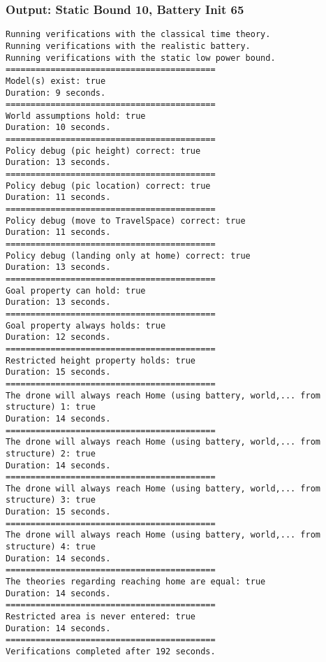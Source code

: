 \documentclass[12pt]{extarticle}
\begin{document}
\subsubsection*{Output: Static Bound 10, Battery Init 65}
\begin{lstlisting}[basicstyle=\tiny]
Running verifications with the classical time theory.
Running verifications with the realistic battery.
Running verifications with the static low power bound.
==========================================
Model(s) exist: true
Duration: 9 seconds.
==========================================
World assumptions hold: true
Duration: 10 seconds.
==========================================
Policy debug (pic height) correct: true
Duration: 13 seconds.
==========================================
Policy debug (pic location) correct: true
Duration: 11 seconds.
==========================================
Policy debug (move to TravelSpace) correct: true
Duration: 11 seconds.
==========================================
Policy debug (landing only at home) correct: true
Duration: 13 seconds.
==========================================
Goal property can hold: true
Duration: 13 seconds.
==========================================
Goal property always holds: true
Duration: 12 seconds.
==========================================
Restricted height property holds: true
Duration: 15 seconds.
==========================================
The drone will always reach Home (using battery, world,... from structure) 1: true
Duration: 14 seconds.
==========================================
The drone will always reach Home (using battery, world,... from structure) 2: true
Duration: 14 seconds.
==========================================
The drone will always reach Home (using battery, world,... from structure) 3: true
Duration: 15 seconds.
==========================================
The drone will always reach Home (using battery, world,... from structure) 4: true
Duration: 14 seconds.
==========================================
The theories regarding reaching home are equal: true
Duration: 14 seconds.
==========================================
Restricted area is never entered: true
Duration: 14 seconds.
==========================================
Verifications completed after 192 seconds.
\end{lstlisting}
\end{document}
